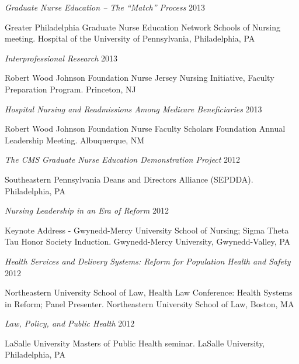 \documentclass[10pt,]{article}
\begin{document}
{{{{{{{{{{{{{{{\begin{hangparas}{.5in}{1}
{\textit {Graduate Nurse Education – The “Match” Process}} \hfill 2013 
\vspace{-2.5mm}
\begin{adjustwidth}{0.5cm}{1cm}
Greater Philadelphia Graduate Nurse Education Network Schools of Nursing meeting. Hospital of the University of Pennsylvania, Philadelphia, PA
\end{adjustwidth}

{\textit {Interprofessional Research}} \hfill 2013 
\vspace{-2.5mm}
\begin{adjustwidth}{0.5cm}{1cm}
Robert Wood Johnson Foundation Nurse Jersey Nursing Initiative, Faculty Preparation Program. Princeton, NJ
\end{adjustwidth}

{\textit {Hospital Nursing and Readmissions Among Medicare Beneficiaries}} \hfill 2013 
\vspace{-2.5mm}
\begin{adjustwidth}{0.5cm}{1cm}
Robert Wood Johnson Foundation Nurse Faculty Scholars Foundation Annual Leadership Meeting. Albuquerque, NM
\end{adjustwidth}

{\textit {The CMS Graduate Nurse Education Demonstration Project}} \hfill 2012 
\vspace{-2.5mm}
\begin{adjustwidth}{0.5cm}{1cm}
Southeastern Pennsylvania Deans and Directors Alliance (SEPDDA). Philadelphia, PA
\end{adjustwidth}

{\textit {Nursing Leadership in an Era of Reform}} \hfill 2012 
\vspace{-2.5mm}
\begin{adjustwidth}{0.5cm}{1cm}
Keynote Address - Gwynedd-Mercy University School of Nursing; Sigma Theta Tau Honor Society Induction. Gwynedd-Mercy University, Gwynedd-Valley, PA
\end{adjustwidth}

{\textit {Health Services and Delivery Systems: Reform for Population Health and Safety}} \hfill 2012 
\vspace{-2.5mm}
\begin{adjustwidth}{0.5cm}{1cm}
Northeastern University School of Law, Health Law Conference: Health Systems in Reform; Panel Presenter. Northeastern University School of Law, Boston, MA
\end{adjustwidth}

{\textit {Law, Policy, and Public Health}} \hfill 2012 
\vspace{-2.5mm}
\begin{adjustwidth}{0.5cm}{1cm}
LaSalle University Masters of Public Health seminar. LaSalle University, Philadelphia, PA
\end{adjustwidth}


\end{hangparas}}}}}}}}}}}}}}}}
\end{document}
